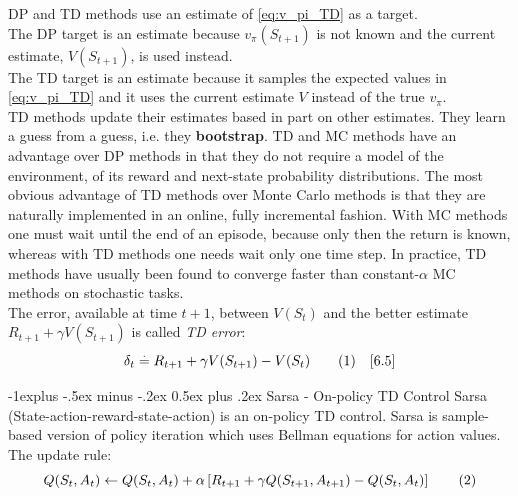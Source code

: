 \documentclass[10pt,landscape]{article}
\makeatletter
\renewcommand{\subsection}{\@startsection{subsection}{2}{0mm}%
                                {-1explus -.5ex minus -.2ex}%
                                {0.5ex plus .2ex}%
                                {\normalfont\normalsize\bfseries}}
\newcommand\numberthis{\addtocounter{equation}{1}\tag{\theequation}}
\makeatother
\begin{document}
\begin{multicols}{3}
DP and TD methods use an estimate of \ref{eq:v_pi_TD} as a target.\\
The DP target is an estimate because $v_{\pi}(S_{t+1})$ is not known and the current estimate, $V(S_{t+1})$, is used instead. \\
The TD target is an estimate because it samples the expected values in \ref{eq:v_pi_TD} and it uses the current estimate $V$ instead of the true $v_{\pi}$.\\

TD methods update their estimates based in part on other estimates. They learn a guess from a guess, i.e. they \textbf{bootstrap}.
TD and MC methods have an advantage over DP methods in that they do not require a model of the environment, of its reward and next-state probability distributions.
The most obvious advantage of TD methods over Monte Carlo methods is that they are naturally implemented in an online, fully incremental fashion. 
With MC methods one must wait until the end of an episode, because only then the return is known, whereas with TD methods one needs wait only one time step.
In practice, TD methods have usually been found to converge faster than constant-$\alpha$ MC methods on stochastic tasks.\\
The error, available at time $t+1$, between $V(S_t)$ and the better estimate $R_{t+1} + \gamma V(S_{t+1})$ is called \emph{TD error}:
\begin{equation*}
\delta_t \stackrel{.}{=} R_{t+1} + \gamma V(S_{t+1}) - V(S_t) \numberthis  \quad [6.5]
\end{equation*}

\subsection{Sarsa - On-policy TD Control}
Sarsa (State-action-reward-state-action) is an on-policy TD control. 
Sarsa is sample-based version of policy iteration which uses Bellman equations for action values. 
The update rule:
\begin{equation*}
    Q(S_t, A_t) \leftarrow Q(S_t, A_t) + \alpha \left[R_{t+1} + \gamma Q(S_{t+1}, A_{t+1}) - Q(S_t, A_t) \right] \numberthis  %
\end{equation*}


\end{multicols}
\end{document}
